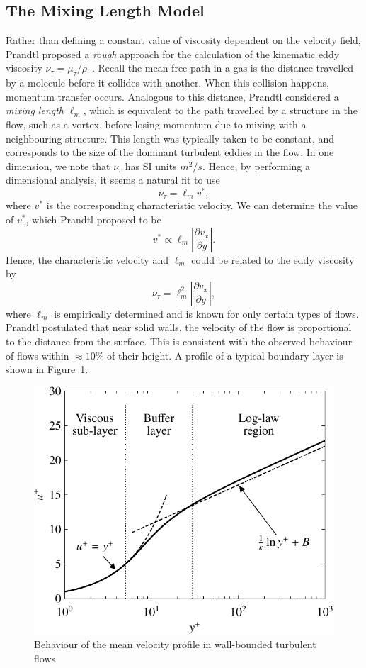 \subsection{The Mixing Length Model}
Rather than defining a constant value of viscosity dependent on the velocity field, Prandtl proposed a \textit{rough} approach for the calculation of the kinematic eddy viscosity $\nu_\tau=\mu_\tau/\rho$~\cite{prandtlBerichtUberUntersuchungen1925}. Recall the mean-free-path in a gas is the distance travelled by a molecule before it collides with another. When this collision happens, momentum transfer occurs. Analogous to this distance, Prandtl considered a \textit{mixing length} $\ell_m$, which is equivalent to the path travelled by a structure in the flow, such as a vortex, before losing momentum due to mixing with a neighbouring structure. This length was typically taken to be constant, and corresponds to the size of the dominant turbulent eddies in the flow. In one dimension, we note that $\nu_\tau$ has SI units $m^2/s$. Hence, by performing a dimensional analysis, it seems a natural fit to use
\begin{equation}
	\nu_\tau = \ell_m v^*,
\end{equation}
where $v^*$ is the corresponding characteristic velocity. We can determine the value of $v^*$, which Prandtl proposed to be
\begin{equation}
	v^* \propto \ell_m \left|\frac{\partial \overline v_x}{\partial y}\right|.
\end{equation}
Hence, the characteristic velocity and $\ell_m$ could be related to the eddy viscosity by
\begin{equation}
    \nu_\tau = \ell_m^2 \left| \frac{\partial \overline v_x}{\partial y}\right|,
\end{equation}
where $\ell_m$ is empirically determined and is known for only certain types of flows. Prandtl postulated that near solid walls, the velocity of the flow is proportional to the distance from the surface. This is consistent with the observed behaviour of flows within $\approx 10\%$ of their height. A profile of a typical boundary layer is shown in Figure~\ref{fig:law_of_the_wall}. 
\begin{figure}[htbp]
	\centering
	\includegraphics[height=0.45\linewidth]{Pictures/law_of_the_wall}
	\caption{Behaviour of the mean velocity profile in wall-bounded turbulent flows}
	\label{fig:law_of_the_wall}
\end{figure}

